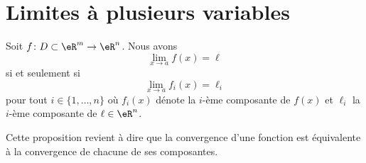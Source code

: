 \section{Limites à plusieurs variables}

\begin{proposition}	\label{PropLimParcompos}
	Soit $f\colon D\subset\eR^m\to \eR^n$. Nous avons
	\begin{equation}
		\lim_{x\to a} f(x)=\ell
	\end{equation}
	si et seulement si
	\begin{equation}
		\lim_{x\to a} f_i(x)=\ell_i
	\end{equation}
	pour tout $i\in\{ 1,\ldots,n \}$ où $f_i(x)$ dénote la $i$-ème composante de $f(x)$ et $\ell_i$ la $i$-ème composante de $\ell\in\eR^n$.
\end{proposition}
Cette proposition revient à dire que la convergence d'une fonction est équivalente à la convergence de chacune de ses composantes.

